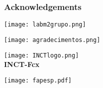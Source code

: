 \documentclass[8pt]{beamer}
\begin{document}
\begin{frame}
	\frametitle{Acknowledgements}
	\vspace{-0.13cm}
    \begin{minipage}{0.42\textwidth}
		\begin{center}
   			\texttt{[image: labm2grupo.png]}
    	\end{center}	   		
    \end{minipage}    
	\begin{minipage}{0.57\textwidth}
		\begin{minipage}{0.49\textwidth}
		  	\begin{center}
		   		\texttt{[image: agradecimentos.png]}    
		   	\end{center}	    	
		\end{minipage}    
		\begin{minipage}{0.49\textwidth}
		   	\begin{center}
		   		\texttt{[image: INCTlogo.png]}\\
		   		\textbf{\LARGE INCT-Fcx}
		   	\end{center}	       	
		\end{minipage}
		\begin{center}
			\texttt{[image: fapesp.pdf]}    
		\end{center}		            
	\end{minipage}


\end{frame}
\end{document}

